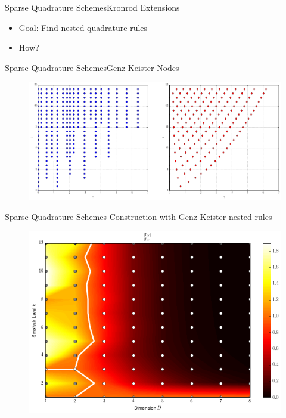 \documentclass{beamer}
\begin{document}
\begin{frame}{Sparse Quadrature Schemes}{Kronrod Extensions}
  \begin{itemize}
    \item Goal: Find nested quadrature rules
    \item How?
  \end{itemize}
\end{frame}


\begin{frame}{Sparse Quadrature Schemes}{Genz-Keister Nodes}
  \begin{figure}
    \centering
    \includegraphics[width=\linewidth]{./fig/genz_keister_nodes.png}
  \end{figure}
\end{frame}


\begin{frame}{Sparse Quadrature Schemes}
  Construction with Genz-Keister nested rules
  \begin{figure}
    \centering
    \includegraphics[width=0.8\linewidth]{./fig/smolyak_genzkeister_ratiomap.png}
  \end{figure}
\end{frame}
\end{document}
